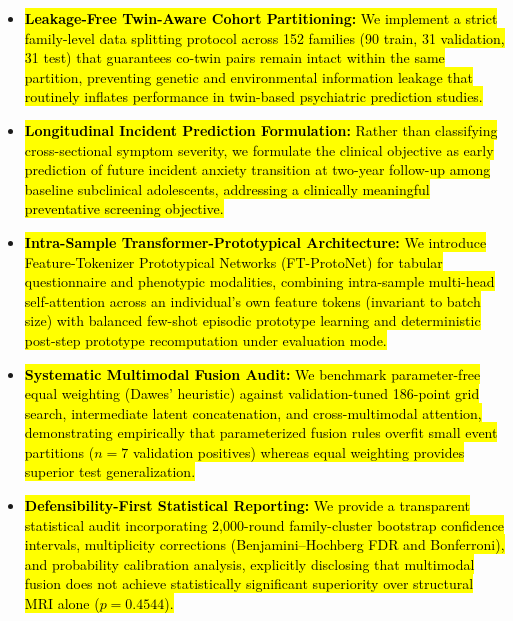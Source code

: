 \documentclass[10pt,letterpaper]{article}
\begin{document}
        \begin{itemize}
        
        \item \hl{\textbf{Leakage-Free Twin-Aware Cohort Partitioning:} We implement a strict family-level data splitting protocol across 152 families (90 train, 31 validation, 31 test) that guarantees co-twin pairs remain intact within the same partition, preventing genetic and environmental information leakage that routinely inflates performance in twin-based psychiatric prediction studies.}
        
        \item \hl{\textbf{Longitudinal Incident Prediction Formulation:} Rather than classifying cross-sectional symptom severity, we formulate the clinical objective as early prediction of future incident anxiety transition at two-year follow-up among baseline subclinical adolescents, addressing a clinically meaningful preventative screening objective.}
        
        \item \hl{\textbf{Intra-Sample Transformer-Prototypical Architecture:} We introduce Feature-Tokenizer Prototypical Networks (FT-ProtoNet) for tabular questionnaire and phenotypic modalities, combining intra-sample multi-head self-attention across an individual's own feature tokens (invariant to batch size) with balanced few-shot episodic prototype learning and deterministic post-step prototype recomputation under evaluation mode.}
        
        \item \hl{\textbf{Systematic Multimodal Fusion Audit:} We benchmark parameter-free equal weighting (Dawes' heuristic) against validation-tuned 186-point grid search, intermediate latent concatenation, and cross-multimodal attention, demonstrating empirically that parameterized fusion rules overfit small event partitions ($n=7$ validation positives) whereas equal weighting provides superior test generalization.}
        
        \item \hl{\textbf{Defensibility-First Statistical Reporting:} We provide a transparent statistical audit incorporating 2,000-round family-cluster bootstrap confidence intervals, multiplicity corrections (Benjamini--Hochberg FDR and Bonferroni), and probability calibration analysis, explicitly disclosing that multimodal fusion does not achieve statistically significant superiority over structural MRI alone ($p = 0.4544$).}
        
        \end{itemize}
\end{document}
